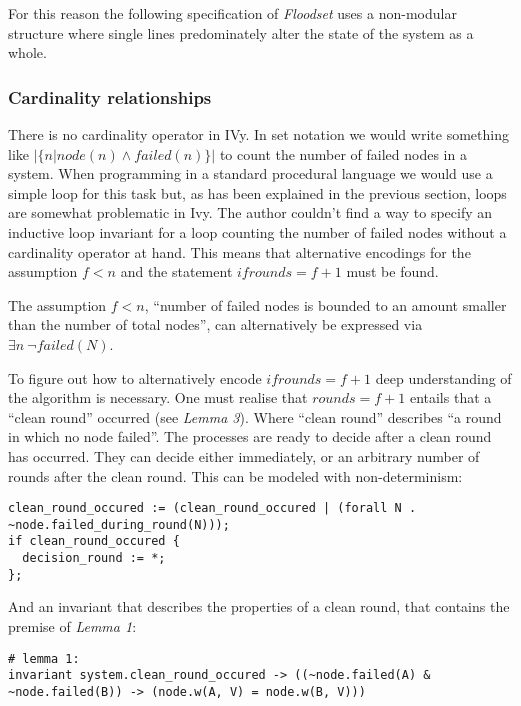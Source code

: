 \documentclass[fleqn]{article}
\begin{document}
For this reason the following specification of \textit{Floodset} uses a non-modular structure where single lines predominately alter the state of the system as a whole.


\subsubsection{Cardinality relationships}
There is no cardinality operator in IVy. In set notation we would write something like $|\{n|node(n) \land failed(n)\}|$ to count the number of failed nodes in a system. When programming in a standard procedural language we would use a simple loop for this task but, as has been explained in the previous section, loops are somewhat problematic in Ivy. The author couldn't find a way to specify an inductive loop invariant for a loop counting the number of failed nodes without a cardinality operator at hand. This means that alternative encodings for the assumption $f<n$ and the statement $if rounds = f+1$ must be found.

The assumption $f<n$, ``number of failed nodes is bounded to an amount smaller than the number of total nodes'', can alternatively be expressed via $\exists n\ \neg failed(N)$.

To figure out how to alternatively encode $if rounds = f+1$ deep understanding of the algorithm is necessary. One must realise that $rounds = f+1$ entails that a ``clean round'' occurred (see \textit{Lemma 3}). Where ``clean round'' describes ``a round in which no node failed''. The processes are ready to decide after a clean round has occurred. They can decide either immediately, or an arbitrary number of rounds after the clean round. This can be modeled with non-determinism:

\begin{mdframed}[backgroundcolor=light-gray, roundcorner=10pt,leftmargin=1, rightmargin=1, innerleftmargin=15, innertopmargin=15,innerbottommargin=15, outerlinewidth=1, linecolor=light-gray]
\begin{lstlisting}
clean_round_occured := (clean_round_occured | (forall N . ~node.failed_during_round(N)));
if clean_round_occured {
  decision_round := *;
};
\end{lstlisting}
\end{mdframed}

And an invariant that describes the properties of a clean round, that contains the premise of \textit{Lemma 1}:

\begin{mdframed}[backgroundcolor=light-gray, roundcorner=10pt,leftmargin=1, rightmargin=1, innerleftmargin=15, innertopmargin=15,innerbottommargin=15, outerlinewidth=1, linecolor=light-gray]
\begin{lstlisting}
# lemma 1:
invariant system.clean_round_occured -> ((~node.failed(A) & ~node.failed(B)) -> (node.w(A, V) = node.w(B, V)))
\end{lstlisting}
\end{mdframed}
\end{document}
